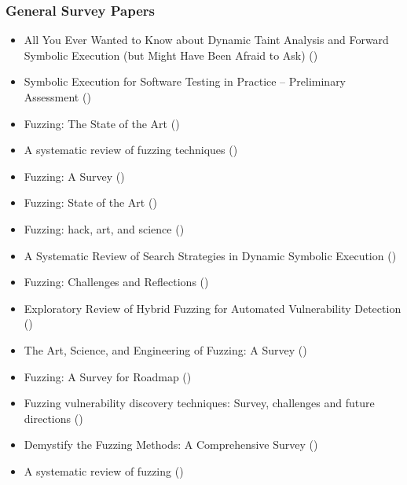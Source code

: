 \documentclass{article}
\begin{document}
\subsubsection{General Survey Papers}
\begin{itemize}
    \item    All You Ever Wanted to Know about Dynamic Taint Analysis and Forward Symbolic Execution (but Might Have Been Afraid to Ask) (\citeyear{AllYouEverWanted})\cite{AllYouEverWanted}
    \item    Symbolic Execution for Software Testing in Practice – Preliminary Assessment (\citeyear{PreliminaryAssessment})\cite{PreliminaryAssessment}
    \item    Fuzzing: The State of the Art (\citeyear{FuzzingTheStateOfTheArt})\cite{FuzzingTheStateOfTheArt}
    \item    A systematic review of fuzzing techniques (\citeyear{Science})\cite{Science}
    \item    Fuzzing: A Survey (\citeyear{FuzzingASurvey})\cite{FuzzingASurvey}
    \item    Fuzzing: State of the Art (\citeyear{FuzzingStateOfTheArt2018})\cite{FuzzingStateOfTheArt2018}
    \item    Fuzzing: hack, art, and science (\citeyear{HackArtScience})\cite{HackArtScience}
    \item    A Systematic Review of Search Strategies in Dynamic Symbolic Execution (\citeyear{SearchStrategies})\cite{SearchStrategies}
    \item    Fuzzing: Challenges and Reflections (\citeyear{ChallengesAndReflections})\cite{ChallengesAndReflections}
    \item    Exploratory Review of Hybrid Fuzzing for Automated Vulnerability Detection (\citeyear{Hybrid})\cite{Hybrid}
    \item    The Art, Science, and Engineering of Fuzzing: A Survey (\citeyear{ArtScienceEngineeringFuzzing})\cite{ArtScienceEngineeringFuzzing}
    \item    Fuzzing: A Survey for Roadmap (\citeyear{FuzzingASurveyforRoadmap})\cite{FuzzingASurveyforRoadmap}
    \item    Fuzzing vulnerability discovery techniques: Survey, challenges and future directions (\citeyear{FuzzingVulnerabilityDiscoveryTechniques})\cite{FuzzingVulnerabilityDiscoveryTechniques}
    \item    Demystify the Fuzzing Methods: A Comprehensive Survey (\citeyear{Demystifying})\cite{Demystifying}
    \item    A systematic review of fuzzing (\citeyear{SystematicReview2023})\cite{SystematicReview2023}
\end{itemize}
\end{document}
